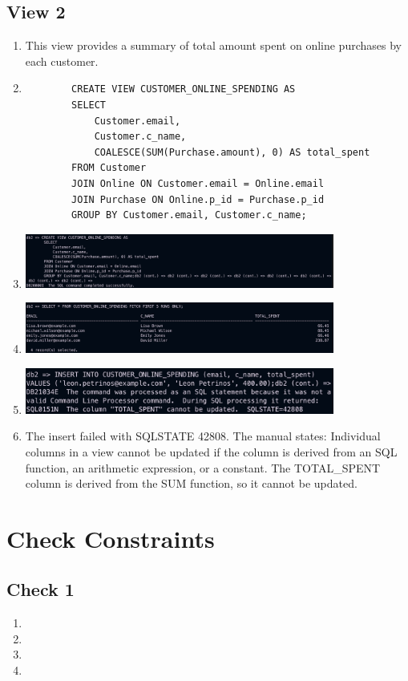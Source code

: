 \documentclass[a4paper,11pt]{article}
\begin{document}
\subsection*{View 2}
\begin{enumerate}[label=(\alph*)]
    \item This view provides a summary of total amount spent on online purchases by each customer.
    \item 
    \begin{lstlisting}
        CREATE VIEW CUSTOMER_ONLINE_SPENDING AS
        SELECT 
            Customer.email,
            Customer.c_name,
            COALESCE(SUM(Purchase.amount), 0) AS total_spent
        FROM Customer
        JOIN Online ON Customer.email = Online.email
        JOIN Purchase ON Online.p_id = Purchase.p_id
        GROUP BY Customer.email, Customer.c_name;
    \end{lstlisting}
    \item 
        \includegraphics[width=0.8\textwidth]{View2.png}
    \item
        \includegraphics[width=0.8\textwidth]{View2_d.png}
    \item
        \includegraphics[width=0.8\textwidth]{View2_e.png}
    \item The insert failed with SQLSTATE 42808. The manual states: 
    Individual columns in a view cannot be updated if the column is derived from an SQL function, an arithmetic expression, or a constant. 
    The TOTAL\_SPENT column is derived from the SUM function, so it cannot be updated.
\end{enumerate}


\section{Check Constraints}
\subsection*{Check 1}
\begin{enumerate}[label=(\alph*)]
    \item
    \item
    \item
    \item
\end{enumerate}
\end{document}
